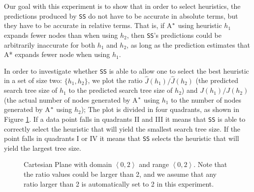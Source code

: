 Our goal with this experiment is to show that in order to select heuristics, the predictions produced by \texttt{SS} do not have to be accurate in absolute terms, but they have to be accurate in relative terms. That is, if A$\sp{*}$ using heuristic $h_{1}$ expands fewer nodes than when using $h_{2}$, then \texttt{SS}'s predictions could be arbitrarily inaccurate for both $h_{1}$ and $h_{2}$, as long as the prediction estimates that A* expands fewer node when using $h_{1}$. %

In order to investigate whether \texttt{SS} is able to allow one to select the best heuristic in a set of size two: $\{h_{1}, h_{2}\}$, we plot the ratio $\hat{J}(h_{1})/\hat{J}(h_{2})$ (the predicted search tree size of $h_{1}$ to the predicted search tree size of $h_{2}$) and $J(h_{1})/J(h_{2})$ (the actual number of nodes generated by A$\sp{*}$ using $h_{1}$ to the number of nodes generated by A$\sp{*}$ using $h_{2}$); 
%
The plot is divided in four quadrants, as shown in Figure \ref{fig:img_cartesian_plane}. If a data point falls in quadrants II and III it means that \texttt{SS} is able to correctly select the heuristic that will 
yield the smallest search tree size. 
If the point falls in quadrants I or IV it means that \texttt{SS} selects the heuristic that will yield the largest tree size. 

\pagestyle{empty}

\begin{figure}[!thb]
\centering  
{}
  \caption{Cartesian Plane with domain $\left\langle 0, 2\right\rangle$ and range $\left\langle 0, 2\right\rangle$. Note that the ratio values could be larger than 2, and we assume that any ratio larger than 2 is automatically set to 2 in this experiment.}\label{fig:img_cartesian_plane}
\end{figure}

